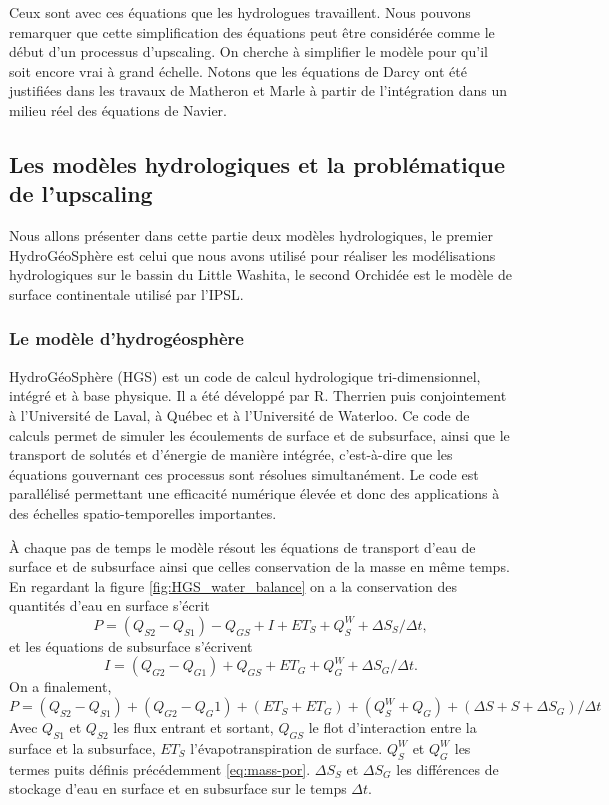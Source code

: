 \documentclass[a4paper,11pt]{article}
\numberwithin{equation}{section}
\begin{document}
Ceux sont avec ces équations que les hydrologues travaillent. Nous pouvons remarquer que cette simplification des équations peut être considérée comme le début d'un processus d'upscaling. On cherche à simplifier le modèle pour qu'il soit encore vrai à grand échelle. Notons que les équations de Darcy ont été justifiées dans les travaux de Matheron et Marle à partir de l'intégration dans un milieu réel des équations de Navier. 

\subsection{Les modèles hydrologiques et la problématique de l'upscaling}
\label{ch:modeles-hydro-upscaling}
Nous allons présenter dans cette partie deux modèles hydrologiques, le premier HydroGéoSphère est celui que nous avons utilisé pour réaliser les modélisations hydrologiques sur le bassin du Little Washita, le second Orchidée est le modèle de surface continentale utilisé par l'IPSL. 

\subsubsection{Le modèle d'hydrogéosphère}

HydroGéoSphère (HGS) est un code de calcul hydrologique tri-dimensionnel, intégré et à base physique. Il a été développé par R. Therrien puis conjointement à l’Université de Laval, à Québec et à l’Université de Waterloo. Ce code de calculs permet de simuler les écoulements de surface et de subsurface, ainsi que le transport de solutés et d’énergie de manière intégrée, c’est-à-dire que les équations gouvernant ces processus sont résolues simultanément. Le code est parallélisé permettant une efficacité numérique élevée et donc des applications à des échelles spatio-temporelles importantes.

À chaque pas de temps le modèle résout les équations de transport d'eau de surface et de subsurface ainsi que celles conservation de la masse en même temps. En regardant la figure \ref{fig:HGS_water_balance} on a la conservation des quantités d'eau en surface s'écrit
\begin{equation}
	\label{eq:HGS-surface}
	P = (Q_{S2}-Q_{S1})-Q_{GS}+I+ET_S+Q^W_S+\Delta S_S /\Delta t,
\end{equation}
et les équations de subsurface s'écrivent
\begin{equation}
	\label{eq:HGS-subsurface}
	I = (Q_{G2}-Q_{G1})+Q_{GS}+ET_G + Q^W_G+\Delta S_G/\Delta t.
\end{equation}
On a finalement,
\begin{equation}
	\label{eq:HGS-bilan-tot}
	P=(Q_{S2}-Q_{S1})+(Q_{G2}-Q_G1)+(ET_S+ET_G)+(Q^W_S+Q_G)+(\Delta S+S+\Delta S_G)/\Delta t
\end{equation}
Avec $Q_{S1}$ et $Q_{S2}$ les flux entrant et sortant, $Q_{GS}$ le flot d'interaction entre la surface et la subsurface, $ET_S$ l'évapotranspiration de surface. $Q^W_S$ et $Q^W_G$ les termes puits définis précédemment \eqref{eq:mass-por}. $\Delta S_S$ et $\Delta S_G$ les différences de stockage d'eau en surface et en subsurface sur le temps $\Delta t$.
\end{document}
